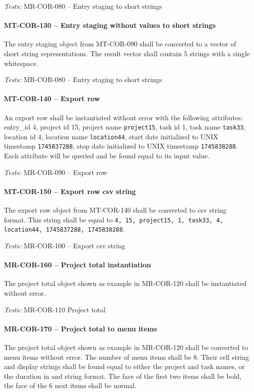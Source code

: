 \textit{Tests: } MR-COR-080 -- Entry staging to short strings

\paragraph{MT-COR-130 -- Entry staging without values to short strings}
The entry staging object from MT-COR-090 shall be converted to
a vector of short string representations. The result vector shall
contain 5 strings with a single whitespace.

\textit{Tests: } MR-COR-080 -- Entry staging to short strings

\paragraph{MT-COR-140 -- Export row}
An export row shall be instantiated without error with the following
attributes: entry_id 4, project id 15, project name \lstinline{project15},
task id 1, task name \lstinline{task33}, location id 4, location name
\lstinline{location44}, start date initialized to UNIX timestamp
\lstinline{1745837288}, stop date initialized to UNIX timestamp
\lstinline{1745838288}.
Each attribute will be queried and be found equal to its input value.

\textit{Tests: } MR-COR-090 -- Export row

\paragraph{MT-COR-150 -- Export row csv string}
The export row object from MT-COR-140 shall be converted to csv string
format. This string shall be equal to
\lstinline{4, 15, project15, 1, task33, 4, location44, 1745837288, 1745838288}.

\textit{Tests: } MR-COR-100 -- Export csv string

\paragraph{MR-COR-160 -- Project total instantiation}
The project total object shown as example in MR-COR-120 shall
be instantiated without error.

\textit{Tests: } MR-COR-110 Project total

\paragraph{MR-COR-170 -- Project total to menu items}
The project total object shown as example in MR-COR-120 shall
be converted to menu items without error.
The number of menu items shall be 8.
Their cell string and display strings shall be found equal
to either the project and task names, or the duration in
and string format. The face of the first two items shall
be bold, the face of the 6 next items shall be normal.

